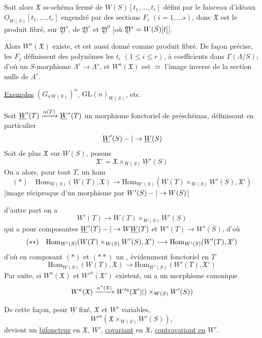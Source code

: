 Soit alors $\mathfrak X$ ss-schéma fermé de $W(S)[t_1,\ldots,t_r]$ défini par  le faisceau d'idéaux  $\underline O_{W(S)}[t_1,\ldots,t_r]$ engendré par des sections $F_i$ $(i=1,\ldots s)$, donc $\mathfrak X$ est le produit fibré, sur $\mathfrak Y^s$, de $\mathfrak Y^r$ et $\mathfrak Y^0$ [où $\mathfrak Y^{*}=W(S)[t]$].

Alors $W^a(\mathfrak X)$ existe, et est aussi donné comme produit fibré. De façon précise, les $F_j$  définissent des polynômes  les $t_i$ $(1\leq i\leq r)$, à coefficients dans $\Gamma(\Lambda/S)$; d'où  un $S$-morphisme $\Lambda^r\to\Lambda^s$, et $W^a(\mathfrak X)$ est $\simeq$ l'image inverse de la section nulle de $\Lambda^s$.

\uline{Exemples}  $(G_{a\,\underline W(S)})^n$, $\mathrm{GL}(n)_{\underline W(S)}$, etc.

Soit $\underline W'(T)\xrightarrow{\alpha(T)}\underline W^{*}(T)$ un morphisme fonctoriel de préschémas, définissant en particulier
\[
\underline W'(S)-|\to\underline W(S)
\]
Soit de plus $\mathfrak X$ sur $W(S)$, posons
\[
\mathfrak X'=\mathfrak X\times_{\underline W(S)}\underline W'(S)
\]
On a alors, pour tout $T$, un hom
\[
(\ast)\quad \mathrm{Hom}_{\underline W(S)}(\underline W(T),\mathfrak X)\longrightarrow
\mathrm{Hom}_{\underline W'(S)}(\underline W(T)\times_{\underline W(S)}\underline W'(S),\mathfrak X')
\]
[image réciproque d'un morphisme par $W'(S)-|\to W(S)$]

d'autre part on a
\[
W'(T)\longrightarrow W(T)\times_{W(S)}W'(S)
\]
 qui a pour composantes $\underline W'(T)-|\to W\underline W(T)$ et $W'(T)\to W'(S)$, d'où
\[
(\ast\ast)\quad\mathrm{Hom}_{W'(S)}(W(T)\times_{W(S)}W'(S),\mathfrak X')\longrightarrow
\mathrm{Hom}_{W'(S)}(W'(T),\mathfrak X')
\]
d'où en composant $(\ast)$ et $(\ast\ast)$ un  , évidemment fonctoriel en $T$
\[
\mathrm{Hom}_{W(S)}(W(T),\mathfrak X)\longrightarrow\mathrm{Hom}_{W'(S)}(W'(T),\mathfrak X')
\]
Par suite, si $W^a(\mathfrak X)$ et $W'^a(\mathfrak X')$ existent, on a un morphisme canonique
\[
W^a(\mathfrak X)\xrightarrow{\alpha^*(\mathfrak X)}W'^a(\mathfrak X')|)\times_{W(S)}W'(S))
\]

De cette façon, pour $\underline W$ fixé,   $\mathfrak X$ et $W'$ variables,
\[
W'^a(\mathfrak X\times_{W(S)}W'(S)),
\]
devient un \uline{bifoncteur} en $\mathfrak X$, $W'$, \uline{covariant} en $\mathfrak X$, \uline{contravariant en} $W'$.

